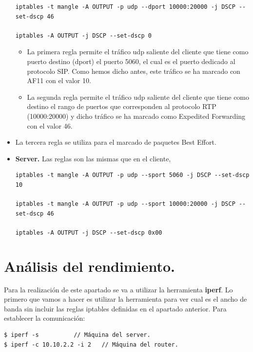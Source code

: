 \documentclass[11pt]{article}
\begin{document}
\begin{itemize}
\begin{lstlisting}[style=C,numbers=none]
iptables -t mangle -A OUTPUT -p udp --dport 10000:20000 -j DSCP --set-dscp 46

iptables -A OUTPUT -j DSCP --set-dscp 0
\end{lstlisting}
\begin{itemize}

\item La primera regla permite el tráfico udp saliente del cliente que tiene como puerto destino (dport) el puerto 5060, el cual es el puerto dedicado al protocolo SIP. Como hemos dicho antes, este tráfico se ha marcado con AF11 con el valor 10.

\item La segunda regla permite el tráfico udp saliente del cliente que tiene como destino el rango de puertos que corresponden al protocolo RTP (10000:20000) y dicho tráfico se ha marcado como Expedited Forwarding con el valor 46.
\end{itemize}

\item La tercera regla se utiliza para el marcado de paquetes Best Effort.

\item \textbf{Server.}
Las reglas son las mismas que en el cliente, %
\begin{lstlisting}[style=C,numbers=none]
iptables -t mangle -A OUTPUT -p udp --sport 5060 -j DSCP --set-dscp 10

iptables -t mangle -A OUTPUT -p udp --sport 10000:20000 -j DSCP --set-dscp 46

iptables -A OUTPUT -j DSCP --set-dscp 0x00
\end{lstlisting}

\end{itemize}
\newpage

\section{Análisis del rendimiento.}
Para la realización de este apartado se va a utilizar la herramienta \textbf{iperf}. Lo primero que vamos a hacer es utilizar la herramienta para ver cual es el ancho de banda sin incluir las reglas iptables definidas en el apartado anterior. Para establecer la comunicación:
\begin{lstlisting}[style=C,numbers=none]
$ iperf -s 			// Máquina del server.
$ iperf -c 10.10.2.2 -i 2	// Máquina del router.
\end{lstlisting}
\end{document}
